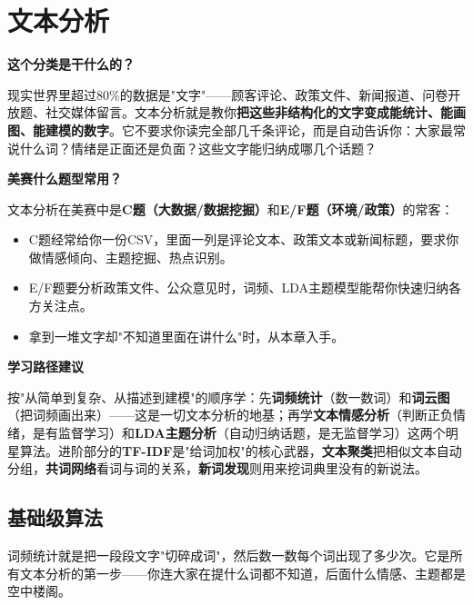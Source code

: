 \chapter{文本分析}

\begin{chapteroverview}
\textbf{这个分类是干什么的？}

现实世界里超过80\%的数据是"文字"——顾客评论、政策文件、新闻报道、问卷开放题、社交媒体留言。文本分析就是教你\textbf{把这些非结构化的文字变成能统计、能画图、能建模的数字}。它不要求你读完全部几千条评论，而是自动告诉你：大家最常说什么词？情绪是正面还是负面？这些文字能归纳成哪几个话题？

\textbf{美赛什么题型常用？}

文本分析在美赛中是\textbf{C题（大数据/数据挖掘）}和\textbf{E/F题（环境/政策）}的常客：
\begin{itemize}
    \item C题经常给你一份CSV，里面一列是评论文本、政策文本或新闻标题，要求你做情感倾向、主题挖掘、热点识别。
    \item E/F题要分析政策文件、公众意见时，词频、LDA主题模型能帮你快速归纳各方关注点。
    \item 拿到一堆文字却"不知道里面在讲什么"时，从本章入手。
\end{itemize}

\textbf{学习路径建议}

按"从简单到复杂、从描述到建模"的顺序学：先\textbf{词频统计}（数一数词）和\textbf{词云图}（把词频画出来）——这是一切文本分析的地基；再学\textbf{文本情感分析}（判断正负情绪，是有监督学习）和\textbf{LDA主题分析}（自动归纳话题，是无监督学习）这两个明星算法。进阶部分的\textbf{TF-IDF}是"给词加权"的核心武器，\textbf{文本聚类}把相似文本自动分组，\textbf{共词网络}看词与词的关系，\textbf{新词发现}则用来挖词典里没有的新说法。
\end{chapteroverview}

\section{基础级算法}


\begin{algointro}
词频统计就是把一段段文字"切碎成词"，然后数一数每个词出现了多少次。它是所有文本分析的第一步——你连大家在提什么词都不知道，后面什么情感、主题都是空中楼阁。
\end{algointro}


